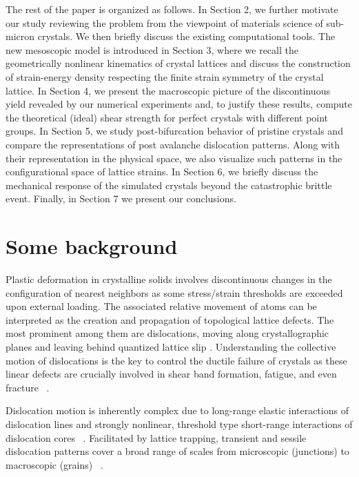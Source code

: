 \documentclass[CRPHYS,Unicode,manuscript]{cedram}
\begin{document}
   
The rest of the paper is organized as follows. In Section 2, we further  motivate our study reviewing the problem from the viewpoint of materials science of sub-micron crystals. We then briefly discuss the existing computational tools.  The  new mesoscopic model is   introduced in Section 3, where we recall the geometrically nonlinear kinematics of crystal lattices and discuss the construction of   strain-energy density respecting the finite strain symmetry of the crystal lattice. In Section 4, we present the macroscopic picture of the discontinuous yield revealed by our numerical experiments and, to justify these results,  compute  the theoretical (ideal) shear strength  for perfect crystals with different   point groups. In Section 5, we  study post-bifurcation behavior of pristine  crystals  and   compare the  representations of post avalanche dislocation  patterns.  Along with their  representation in the physical space, we also visualize such patterns in the configurational space of  lattice strains.  In  Section 6, we briefly discuss the mechanical  response of the simulated  crystals beyond the catastrophic brittle  event. Finally, in Section 7 we   present our conclusions.
 
\section{Some background}

Plastic deformation in crystalline solids involves discontinuous changes in the configuration of nearest neighbors as some stress/strain thresholds are exceeded upon external loading. The associated relative movement of atoms can be interpreted as the creation and propagation of topological lattice defects. The most prominent among them are dislocations, moving along crystallographic planes and leaving behind quantized lattice slip   \cite{Read1955-ps,Cottrell2002-dh,kubin2013dislocations}. Understanding the collective motion of dislocations is the key to control the ductile  failure of crystals as these linear defects are  crucially  involved in  shear band formation, fatigue, and even fracture ~\cite{Differt1986-qi,Antolovich2014-ki,Weiss2019-yl}. 

Dislocation motion is inherently complex due to  long-range elastic interactions  of dislocation lines and strongly nonlinear, threshold type  short-range interactions  of dislocation cores ~\cite{Madec2002-hk,Sethna2017-tm}. Facilitated by lattice trapping, transient and sessile  dislocation patterns  cover a broad range of scales from microscopic (junctions) to macroscopic (grains) ~\cite{Gomez-Garcia2006-ur,Chen2010-sq,Li2011-nf}. 
\end{document}

